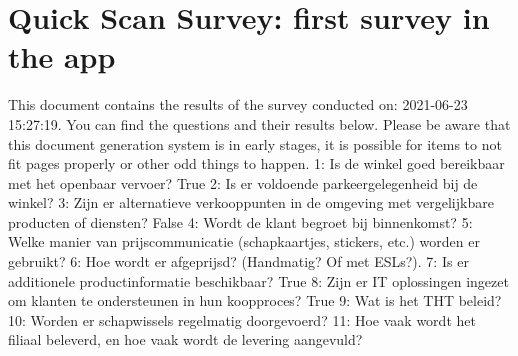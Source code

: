 \documentclass{article}%
\begin{document}
%
\normalsize%
\section{Quick Scan Survey: first survey in the app}%
\label{sec:QuickScanSurveyfirstsurveyintheapp}%
This document contains the results of the survey conducted on: 2021{-}06{-}23 15:27:19. %
You can find the questions and their results below.         Please be aware that this document generation system         is in early stages, it is possible for items to not fit pages properly             or other odd things to happen.%
\newline%
%
1: Is de winkel goed bereikbaar met het openbaar vervoer? %
\newline%
%
\newline%
%
   True%
\newline%
%
2: Is er voldoende parkeergelegenheid bij de winkel? %
\newline%
%
\newline%
%
3: Zijn er alternatieve verkooppunten in de omgeving met vergelijkbare producten of diensten? %
\newline%
%
\newline%
%
   False%
\newline%
%
4: Wordt de klant begroet bij binnenkomst? %
\newline%
%
\newline%
%
5: Welke manier van prijscommunicatie (schapkaartjes, stickers, etc.) worden er gebruikt? %
\newline%
%
\newline%
%
6: Hoe wordt er afgeprijsd? (Handmatig? Of met ESLs?). %
\newline%
%
\newline%
%
7: Is er additionele productinformatie beschikbaar? %
\newline%
%
\newline%
%
   True%
\newline%
%
8: Zijn er IT oplossingen ingezet om klanten te ondersteunen in hun koopproces? %
\newline%
%
\newline%
%
   True%
\newline%
%
9: Wat is het THT beleid? %
\newline%
%
\newline%
%
10: Worden er schapwissels regelmatig doorgevoerd? %
\newline%
%
\newline%
%
11: Hoe vaak wordt het filiaal beleverd, en hoe vaak wordt de levering aangevuld? %
\end{document}

